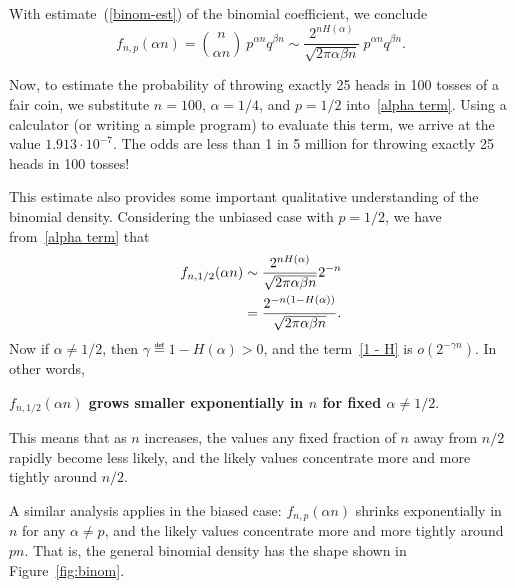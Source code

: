 \documentclass[11pt,twoside]{article}
\begin{document}

With estimate~(\ref{binom-est}) of the binomial coefficient, we conclude
\begin{equation}\label{alpha term}
f_{n,p}(\alpha n) = \binom{n}{\alpha n}\ p^{\alpha n}q^{\beta  n}
\sim \frac{2^{nH(\alpha)}}{\sqrt{2\pi \alpha\beta n}}\ p^{\alpha n}q^{\beta  n}.
\end{equation}

Now, to estimate the probability of throwing exactly 25 heads in 100 tosses
of a fair coin, we substitute $n = 100$, $\alpha = 1/4$, and $p=1/2$
into~\eqref{alpha term}.  Using a calculator (or writing a simple program)
to evaluate this term, we arrive at the value $1.913 \cdot 10^{-7}$.  The
odds are less than 1 in 5 million for throwing exactly 25 heads in 100
tosses!

This estimate also provides some important qualitative understanding of the
binomial density.  Considering the unbiased case with $p = 1/2$, we have
from~\eqref{alpha term} that
\begin{align}
f_{n,1/2}(\alpha n) & \sim \frac{2^{nH(\alpha)}}{\sqrt{2\pi
 \alpha\beta n}} 2^{-n}\notag \\
 & =  \frac{2^{-n(1 - H(\alpha))}}{\sqrt{2\pi \alpha\beta n}}\label{1 - H}.
\end{align}
Now if $\alpha \neq 1/2$, then $\gamma \eqdef 1 - H(\alpha) > 0$, and the
term~\eqref{1 - H} is $o(2^{-\gamma n})$.  In other words,
\begin{center}
\textbf{$f_{n,1/2}(\alpha n)$ grows smaller exponentially in $n$ for fixed
  $\alpha \neq 1/2$}.
\end{center}
This means that as $n$ increases, the values any fixed fraction of $n$ away
from $n/2$ rapidly become less likely, and the likely values concentrate
more and more tightly around $n/2$.

A similar analysis applies in the biased case: $f_{n,p}(\alpha n)$ shrinks
exponentially in $n$ for any $\alpha \neq p$, and the likely values
concentrate more and more tightly around $pn$.  That is, the general
binomial density has the shape shown in Figure~\ref{fig:binom}.
\end{document}
